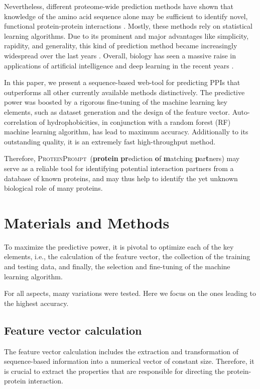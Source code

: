 \documentclass[3p,times,twocolumn]{elsarticle}
\newcommand{\tool}{\textsc{ProteinPrompt}}
\begin{document}
Nevertheless, different proteome-wide prediction methods have shown
that knowledge of the amino acid sequence alone may be sufficient to
identify novel, functional protein-protein interactions
\cite{Martin:2005, Shen:2007}.
Mostly, these methods rely on statistical learning algorithms.
Due to its prominent and major advantages like simplicity, rapidity, and generality, this kind of
prediction method became increasingly widespread over the last years
\cite{Ofran:2003, Betel:2007, Liu:2012, Perovic:2017, Pan:2010}.
Overall, biology has seen a massive raise in applications
of artificial intelligence and deep learning in the recent years
\cite{Ching:2018}.

In this paper, we present a sequence-based web-tool for predicting
PPIs that outperforms all other currently available methods distinctively.
The predictive power was boosted by a rigorous fine-tuning
of the machine learning key elements, such as
dataset generation and the design of the feature vector.
Auto-correlation of hydrophobicities,
in conjunction with a random forest (RF) machine learning algorithm,
has lead to maximum accuracy.
Additionally to its outstanding quality, it is 
an extremely fast high-throughput
method.

Therefore, \tool\  (\textbf{protein} \textbf{pr}ediction \textbf{o}f \textbf{m}atching \textbf{p}ar\textbf{t}ners)
may serve as a reliable tool for identifying potential interaction partners from a database of
known proteins, and may thus help to identify the yet unknown
biological role of many proteins.



\section{Materials and Methods}

To maximize the predictive power, it is pivotal to optimize each of
the key elements, i.e., the calculation of the feature vector, the
collection of the training and testing data, and finally, the
selection and fine-tuning of the machine learning algorithm. 

For all aspects, many variations were tested. Here we focus on the
ones leading to the highest accuracy. 


\subsection{Feature vector calculation}
The feature vector calculation includes the extraction and
transformation of sequence-based information into a numerical vector
of constant size. Therefore, it is crucial to extract the properties
that are responsible for directing the protein-protein interaction. 
\end{document}
